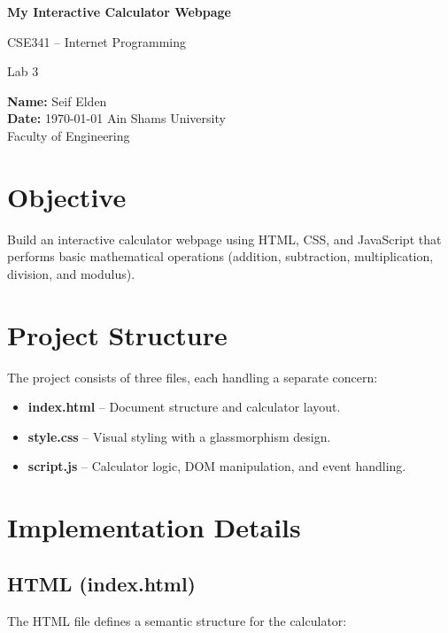 \documentclass[12pt,a4paper]{article}
\begin{document}
\begin{titlepage}
  \centering
  \vspace*{2cm}
  {\Huge\bfseries My Interactive Calculator Webpage\par}
  \vspace{1cm}
  {\Large CSE341 -- Internet Programming\par}
  {\Large Lab 3\par}
  \vspace{2cm}
  {\large
    \textbf{Name:} Seif Elden \\[6pt]
    \textbf{Date:} \today
  }
  \vfill
  {\large Ain Shams University \\ Faculty of Engineering}
\end{titlepage}

\tableofcontents
\newpage

\section{Objective}
Build an interactive calculator webpage using HTML, CSS, and JavaScript that performs basic mathematical operations (addition, subtraction, multiplication, division, and modulus).

\section{Project Structure}
The project consists of three files, each handling a separate concern:

\begin{itemize}
  \item \textbf{index.html} -- Document structure and calculator layout.
  \item \textbf{style.css} -- Visual styling with a glassmorphism design.
  \item \textbf{script.js} -- Calculator logic, DOM manipulation, and event handling.
\end{itemize}

\section{Implementation Details}

\subsection{HTML (index.html)}
The HTML file defines a semantic structure for the calculator:
\end{document}
